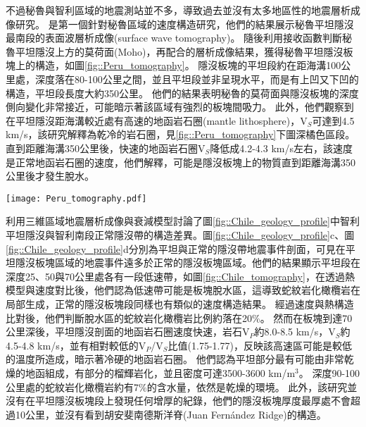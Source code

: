 不過秘魯與智利區域的地震測站並不多，導致過去並沒有太多地區性的地震層析成像研究。
\citet{Ma2014}是第一個針對秘魯區域的速度構造研究，他們的結果展示秘魯平坦隱沒最南段的表面波層析成像(surface wave tomography)。
隨後\citet{Ma2015}利用接收函數判斷秘魯平坦隱沒上方的莫荷面(Moho)，再配合\citet{Ma2014}的層析成像結果，獲得秘魯平坦隱沒板塊上的構造，如圖\ref{fig::Peru_tomography}。
隱沒板塊的平坦段約在距海溝100公里處，深度落在80-100公里之間，並且平坦段並非呈現水平，而是有上凹又下凹的構造，平坦段長度大約350公里。
他們的結果表明秘魯的莫荷面與隱沒板塊的深度側向變化非常接近，可能暗示著該區域有強烈的板塊間吸力。
此外，他們觀察到在平坦隱沒距海溝較近處有高速的地函岩石圈(mantle lithosphere)，V$_S$可達到4.5 km/s，該研究解釋為乾冷的岩石圈，見\ref{fig::Peru_tomography}下圖深橘色區段。
直到距離海溝350公里後，快速的地函岩石圈V$_S$降低成4.2-4.3 km/s左右，該速度是正常地函岩石圈的速度，他們解釋，可能是隱沒板塊上的物質直到距離海溝350公里後才發生脫水。

\begin{figure*}[ht!]
    \centering
    \texttt{[image: Peru\_tomography.pdf]}
    \caption[秘魯平坦隱沒南段地震學研究結果與解釋圖，摘自\citet{Ma2015}]{秘魯平坦隱沒南段地震學研究結果與解釋圖，摘自\citet{Ma2015}。(a)深度80公里的V$_{SV}$速度構造，來自\citet{Ma2014}。圖中左上方標示高速地函岩石圈與正常地函岩石圈的分界。紅色虛線標示出於20公里深的低速帶範圍，該低速帶被解釋為熔融區。粉紅色線為板塊等深度線。紅色實線為圖(C)中AA'剖面位置。灰色點為該研究所使用的側站位置。(b)板塊等深度圖，各顏色點為接收函數轉換波的地殼入射點，顏色代表不同深度。灰色點為該研究所使用的側站位置。(c)最上圖為AA'剖面地形，中圖為AA'剖面V$_{SV}$速度構造圖，白色點與紅色點分別為接收函數於西北地震事件群與東南地震事件群所獲得之板塊深度。最下方為AA'剖面結構卡通圖，大陸與海洋莫荷面深度來自圖(b)中的結果。
    }
    \label{fig::Peru_tomography}
\end{figure*}

\citet{Marot2014}利用三維區域地震層析成像與衰減模型討論了圖\ref{fig::Chile_geology_profile}中智利平坦隱沒與智利南段正常隱沒帶的構造差異。圖\ref{fig::Chile_geology_profile}c、圖\ref{fig::Chile_geology_profile}d分別為平坦與正常的隱沒帶地震事件剖面，可見在平坦隱沒板塊區域的地震事件遠多於正常的隱沒板塊區域。他們的結果顯示平坦段在深度25、50與70公里處各有一段低速帶，如圖\ref{fig::Chile_tomography}，在透過熱模型與速度對比後，他們認為低速帶可能是板塊脫水區，這導致蛇紋岩化橄欖岩在局部生成，正常的隱沒板塊段同樣也有類似的速度構造結果。
經過速度與熱構造比對後，他們判斷脫水區的蛇紋岩化橄欖岩比例約落在20$\%$。
然而在板塊到達70公里深後，平坦隱沒剖面的地函岩石圈速度快速，岩石V$_P$約8.0-8.5 km/s，V$_S$約4.5-4.8 km/s，並有相對較低的V$_P$/V$_S$比值(1.75-1.77)，反映該高速區可能是較低的溫度所造成，暗示著冷硬的地函岩石圈。
他們認為平坦部分最有可能由非常乾燥的地函組成，有部分的榴輝岩化，並且密度可達3500-3600 km/m$^3$。
深度90-100公里處的蛇紋岩化橄欖岩約有7$\%$的含水量，依然是乾燥的環境。
此外，該研究並沒有在平坦隱沒板塊段上發現任何增厚的紀錄，他們的隱沒板塊厚度最厚處不會超過10公里，並沒有看到胡安斐南德斯洋脊(Juan Fernández Ridge)的構造。

